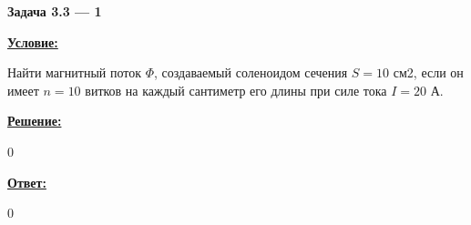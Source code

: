 
\begin{center}
    \textbf{Задача 3.3 --- 1}
\end{center}

\underline{\textbf{Условие:}}

Найти магнитный поток 
$ \Phi $, создаваемый соленоидом сечения 
$ S = 10 $ см2, 
если он имеет 
$ n = 10 $ витков на каждый сантиметр его длины при силе тока $ I = 20 $ А.

\underline{\textbf{Решение:}}

0

\underline{\textbf{Ответ:}}

0
